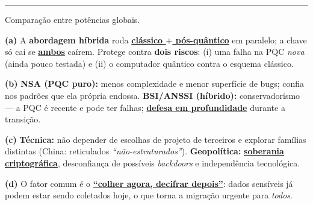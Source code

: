 \documentclass[11pt,a4paper]{article}
\newcommand{\alert}[1]{\textbf{\uline{#1}}}
\newcommand{\exercicio}[1]{%
    \Needspace{8\baselineskip}%
    \par\vspace{1.2em}
    \noindent
    {\color{black!55}\rule[-0.25em]{3pt}{1.6em}}%
    \hspace{0.6em}{\Large\bfseries Exerc\'{i}cio #1}
    \par\vspace{-0.4em}
    \noindent{\color{black!35}\rule{\textwidth}{0.4pt}}
    \par\vspace{0.35em}
}
\newenvironment{resposta}{%
    \begin{respostabox}
    \color{red!70!black}\sloppy
}{%
    \end{respostabox}
}
\begin{document}
\exercicio{11}
Compara\c{c}\~{a}o entre pot\^{e}ncias globais.\begin{resposta}
\textbf{(a)} A \textbf{abordagem h\'{i}brida} roda \alert{cl\'{a}ssico $+$ p\'{o}s-qu\^{a}ntico} em paralelo; a chave s\'{o} cai se \alert{ambos} ca\'{i}rem. Protege contra \textbf{dois riscos}: (i) uma falha na PQC \emph{nova} (ainda pouco testada) e (ii) o computador qu\^{a}ntico contra o esquema cl\'{a}ssico.

\textbf{(b)} \textbf{NSA (PQC puro):} menos complexidade e menor superf\'{i}cie de bugs; confia nos padr\~{o}es que ela pr\'{o}pria endossa. \textbf{BSI/ANSSI (h\'{i}brido):} conservadorismo --- a PQC \'{e} recente e pode ter falhas; \alert{defesa em profundidade} durante a transi\c{c}\~{a}o.

\textbf{(c)} \textbf{T\'{e}cnica:} n\~{a}o depender de escolhas de projeto de terceiros e explorar fam\'{i}lias distintas (China: reticulados \emph{``n\~{a}o-estruturados''}). \textbf{Geopol\'{i}tica:} \alert{soberania criptogr\'{a}fica}, desconfian\c{c}a de poss\'{i}veis \textit{backdoors} e independ\^{e}ncia tecnol\'{o}gica.

\textbf{(d)} O fator comum \'{e} o \alert{``colher agora, decifrar depois''}: dados sens\'{i}veis j\'{a} podem estar sendo coletados hoje, o que torna a migra\c{c}\~{a}o urgente para \emph{todos}.
\end{resposta}
\end{document}
